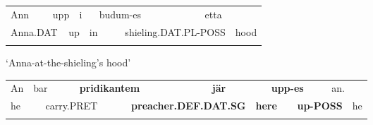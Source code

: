 \begin{listWWNumlxxviileveli}
\item {}

\end{listWWNumlxxviileveli}

\begin{tabular}{llllllllll}
\lsptoprule
\footnotemark{}Ann & \multicolumn{2}{l}{upp

} & \multicolumn{2}{l}{i

} & \multicolumn{2}{l}{budum-es 

} & \multicolumn{2}{l}{etta 

} & \\
\multicolumn{2}{l}{Anna.DAT

} & \multicolumn{2}{l}{up

} & \multicolumn{2}{l}{in

} & \multicolumn{2}{l}{shieling.DAT.PL-POSS

} & \multicolumn{2}{l}{hood

}\\
\lspbottomrule
\end{tabular}

\footnotetext{}

\begin{styleTranslation}
‘Anna-at-the-shieling’s hood’ 

\end{styleTranslation}

\begin{tabular}{llllllllllll}
\lsptoprule
An & \multicolumn{2}{l}{bar

} & \multicolumn{2}{l}{{\bfseries pridikantem}

} & \multicolumn{2}{l}{{\bfseries jär}

} & \multicolumn{2}{l}{{\bfseries upp-es}

} & \multicolumn{2}{l}{an. 

} & \\
\multicolumn{2}{l}{he

} & \multicolumn{2}{l}{carry.PRET

} & \multicolumn{2}{l}{{\bfseries preacher.DEF.DAT.SG}

} & \multicolumn{2}{l}{{\bfseries here}

} & \multicolumn{2}{l}{{\bfseries up-POSS}

} & \multicolumn{2}{l}{he

}\\
\lspbottomrule
\end{tabular}

